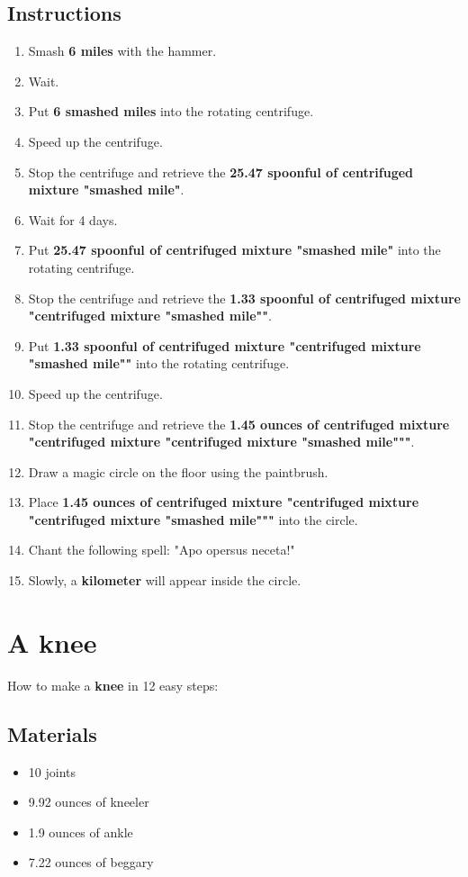 \documentclass{article}
\begin{document}
\subsection{Instructions}\begin{enumerate}
\item 
Smash \textbf{6 miles} with the hammer.
\item 
Wait.
\item 
Put \textbf{6 smashed miles} into the rotating centrifuge.
\item 
Speed up the centrifuge.
\item 
Stop the centrifuge and retrieve the \textbf{25.47 spoonful of centrifuged mixture "smashed mile"}.
\item 
Wait for 4 days.
\item 
Put \textbf{25.47 spoonful of centrifuged mixture "smashed mile"} into the rotating centrifuge.
\item 
Stop the centrifuge and retrieve the \textbf{1.33 spoonful of centrifuged mixture "centrifuged mixture "smashed mile""}.
\item 
Put \textbf{1.33 spoonful of centrifuged mixture "centrifuged mixture "smashed mile""} into the rotating centrifuge.
\item 
Speed up the centrifuge.
\item 
Stop the centrifuge and retrieve the \textbf{1.45 ounces of centrifuged mixture "centrifuged mixture "centrifuged mixture "smashed mile"""}.
\item 
Draw a magic circle on the floor using the paintbrush.
\item 
Place \textbf{1.45 ounces of centrifuged mixture "centrifuged mixture "centrifuged mixture "smashed mile"""} into the circle.
\item 
Chant the following spell: "Apo opersus neceta!"
\item 
Slowly, a \textbf{kilometer} will appear inside the circle.
\end{enumerate}
\newpage
\section{A knee}How to make a \textbf{knee} in 12 easy steps:

\subsection{Materials}\begin{itemize}
\item 
10 joints
\item 
9.92 ounces of kneeler
\item 
1.9 ounces of ankle
\item 
7.22 ounces of beggary
\end{itemize}
\end{document}
